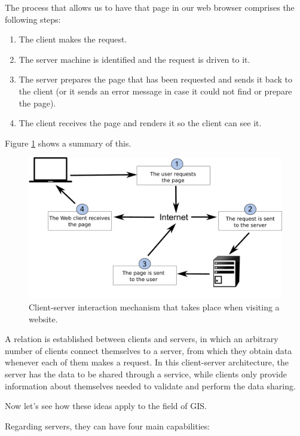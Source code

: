 The process that allows us to have that page in our web browser comprises the following steps:

\begin{enumerate}
	\item The client makes the request.
	\item The server machine is identified and the request is driven to it.
	\item The server prepares the page that has been requested and sends it back to the client (or it sends an error message in case it could not find or prepare the page).
	\item The client receives the page and renders it so the client can see it.
\end{enumerate}


Figure \ref{Fig:How_internet_works} shows a summary of this.

\begin{figure}[!hbt]   
\centering
\includegraphics[width=\columnwidth]{Software/How_internet_works.pdf}
\caption{\small Client-server interaction mechanism that takes place when visiting a website.}
\label{Fig:How_internet_works} 
\end{figure}

A relation is established between clients and servers, in which an arbitrary number of clients connect themselves to a server, from which they obtain data whenever each of them makes a request. In this client-server architecture, the server has the data to be shared through a service, while clients only provide information about themselves needed to validate and perform the data sharing.

Now let's see how these ideas apply to the field of GIS.

Regarding servers, they can have four main capabilities:


